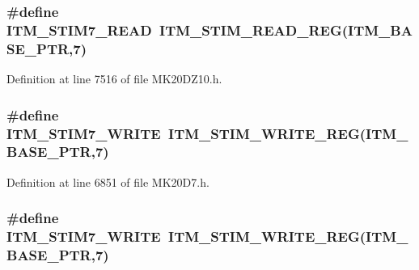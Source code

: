 \subsubsection[{\texorpdfstring{I\+T\+M\+\_\+\+S\+T\+I\+M7\+\_\+\+R\+E\+AD}{ITM_STIM7_READ}}]{\setlength{\rightskip}{0pt plus 5cm}\#define I\+T\+M\+\_\+\+S\+T\+I\+M7\+\_\+\+R\+E\+AD~{\bf I\+T\+M\+\_\+\+S\+T\+I\+M\+\_\+\+R\+E\+A\+D\+\_\+\+R\+EG}({\bf I\+T\+M\+\_\+\+B\+A\+S\+E\+\_\+\+P\+TR},7)}\hypertarget{group___i_t_m___register___accessor___macros_gad3fb2b38ef6a9727bd3036cf014f3d61}{}\label{group___i_t_m___register___accessor___macros_gad3fb2b38ef6a9727bd3036cf014f3d61}


Definition at line 7516 of file M\+K20\+D\+Z10.\+h.

\subsubsection[{\texorpdfstring{I\+T\+M\+\_\+\+S\+T\+I\+M7\+\_\+\+W\+R\+I\+TE}{ITM_STIM7_WRITE}}]{\setlength{\rightskip}{0pt plus 5cm}\#define I\+T\+M\+\_\+\+S\+T\+I\+M7\+\_\+\+W\+R\+I\+TE~{\bf I\+T\+M\+\_\+\+S\+T\+I\+M\+\_\+\+W\+R\+I\+T\+E\+\_\+\+R\+EG}({\bf I\+T\+M\+\_\+\+B\+A\+S\+E\+\_\+\+P\+TR},7)}\hypertarget{group___i_t_m___register___accessor___macros_ga5a34eadd8072ebc43f50398cb76171af}{}\label{group___i_t_m___register___accessor___macros_ga5a34eadd8072ebc43f50398cb76171af}


Definition at line 6851 of file M\+K20\+D7.\+h.

\subsubsection[{\texorpdfstring{I\+T\+M\+\_\+\+S\+T\+I\+M7\+\_\+\+W\+R\+I\+TE}{ITM_STIM7_WRITE}}]{\setlength{\rightskip}{0pt plus 5cm}\#define I\+T\+M\+\_\+\+S\+T\+I\+M7\+\_\+\+W\+R\+I\+TE~{\bf I\+T\+M\+\_\+\+S\+T\+I\+M\+\_\+\+W\+R\+I\+T\+E\+\_\+\+R\+EG}({\bf I\+T\+M\+\_\+\+B\+A\+S\+E\+\_\+\+P\+TR},7)}\hypertarget{group___i_t_m___register___accessor___macros_ga5a34eadd8072ebc43f50398cb76171af}{}\label{group___i_t_m___register___accessor___macros_ga5a34eadd8072ebc43f50398cb76171af}


